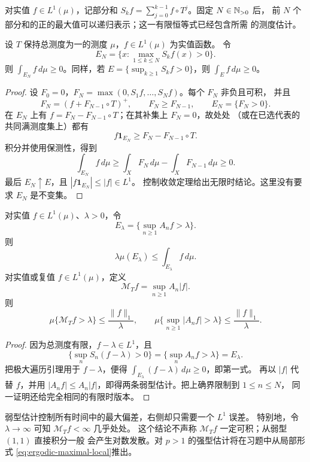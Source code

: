 对实值 $f\in L^1(\mu)$，记部分和
$S_kf=\sum_{j=0}^{k-1}f\circ T^j$。固定 $N\in\mathbb{N}_{>0}$ 后，
前 $N$ 个部分和的正的最大值可以递归表示；这一有限恒等式已经包含所需
的测度估计。

\begin{lemma}[有限时极大遍历引理]\label{lem:finite-maximal-ergodic}
设 $T$ 保持总测度为一的测度 $\mu$，$f\in L^1(\mu)$ 为实值函数。
令
\[
 E_N=\{x:\max_{1\le k\le N}S_kf(x)>0\}.
\]
则 $\int_{E_N}f\,d\mu\ge0$。同样，若
$E=\{\sup_{k\ge1}S_kf>0\}$，则 $\int_Ef\,d\mu\ge0$。
\end{lemma}
\begin{proof}
设 $F_0=0$，$F_N=\max(0,S_1f,\ldots,S_Nf)$。每个 $F_N$ 非负且可积，
并且
\[
 F_N=(f+F_{N-1}\circ T)^+,
 \qquad F_N\ge F_{N-1},\qquad E_N=\{F_N>0\}.
\]
在 $E_N$ 上有 $f=F_N-F_{N-1}\circ T$；在其补集上 $F_N=0$，故处处
（或在已选代表的共同满测度集上）都有
\[
 f\mathbf1_{E_N}\ge F_N-F_{N-1}\circ T.
\]
积分并使用保测性，得到
\[
 \int_{E_N}f\,d\mu
 \ge\int_XF_N\,d\mu-\int_XF_{N-1}\,d\mu\ge0.
\]
最后 $E_N\uparrow E$，且 $|f\mathbf1_{E_N}|\le|f|\in L^1$。
控制收敛定理给出无限时结论。这里没有要求 $E_N$ 是不变集。
\end{proof}

\begin{theorem}[遍历极大不等式]\label{thm:ergodic-maximal-weak}
对实值 $f\in L^1(\mu)$、$\lambda>0$，令
\[
 E_\lambda=\{\sup_{n\ge1}A_nf>\lambda\}.
\]
则
\begin{equation}\label{eq:ergodic-maximal-local}
 \lambda\mu(E_\lambda)\le\int_{E_\lambda}f\,d\mu.
\end{equation}
对实值或复值 $f\in L^1(\mu)$，定义
\[
 \mathcal M_Tf=\sup_{n\ge1}A_n|f|.
\]
则
\begin{equation}\label{eq:ergodic-maximal-weak}
 \mu\{\mathcal M_Tf>\lambda\}\le\frac{\|f\|_1}{\lambda},
 \qquad
 \mu\{\sup_{n\ge1}|A_nf|>\lambda\}
 \le\frac{\|f\|_1}{\lambda}.
\end{equation}
\end{theorem}
\begin{proof}
因为总测度有限，$f-\lambda\in L^1$，且
\[
 \{\sup_nS_n(f-\lambda)>0\}
 =\{\sup_nA_nf>\lambda\}=E_\lambda.
\]
把极大遍历引理用于 $f-\lambda$，便得
$\int_{E_\lambda}(f-\lambda)\,d\mu\ge0$，即第一式。
再以 $|f|$ 代替 $f$，并用
$|A_nf|\le A_n|f|$，即得两条弱型估计。把上确界限制到 $1\le n\le N$，
同一证明还给完全相同的有限时版本。
\end{proof}

弱型估计控制所有时间中的最大偏差，右侧却只需要一个 $L^1$ 误差。
特别地，令 $\lambda\to\infty$ 可知 $\mathcal M_Tf<\infty$ 几乎处处。
这个结论不声称 $\mathcal M_Tf$ 一定可积；从弱型 $(1,1)$ 直接积分一般
会产生对数发散。对 $p>1$ 的强型估计将在习题中从局部形式
\eqref{eq:ergodic-maximal-local}推出。

